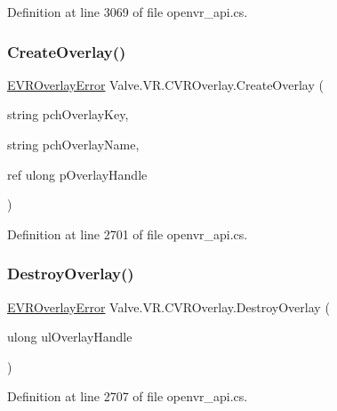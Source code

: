 Definition at line 3069 of file openvr\+\_\+api.\+cs.

\mbox{\label{class_valve_1_1_v_r_1_1_c_v_r_overlay_a4b1c60e2e0e778f30b2a39a987f96de5}} 
\subsubsection{\texorpdfstring{CreateOverlay()}{CreateOverlay()}}
{\footnotesize\ttfamily \mbox{\hyperlink{namespace_valve_1_1_v_r_aaee5c5144f42b7969d45b854f51b0c18}{E\+V\+R\+Overlay\+Error}} Valve.\+V\+R.\+C\+V\+R\+Overlay.\+Create\+Overlay (\begin{DoxyParamCaption}\item[{string}]{pch\+Overlay\+Key,  }\item[{string}]{pch\+Overlay\+Name,  }\item[{ref ulong}]{p\+Overlay\+Handle }\end{DoxyParamCaption})}



Definition at line 2701 of file openvr\+\_\+api.\+cs.

\mbox{\label{class_valve_1_1_v_r_1_1_c_v_r_overlay_a6bbcbda8364751a199a9219de2142f23}} 
\subsubsection{\texorpdfstring{DestroyOverlay()}{DestroyOverlay()}}
{\footnotesize\ttfamily \mbox{\hyperlink{namespace_valve_1_1_v_r_aaee5c5144f42b7969d45b854f51b0c18}{E\+V\+R\+Overlay\+Error}} Valve.\+V\+R.\+C\+V\+R\+Overlay.\+Destroy\+Overlay (\begin{DoxyParamCaption}\item[{ulong}]{ul\+Overlay\+Handle }\end{DoxyParamCaption})}



Definition at line 2707 of file openvr\+\_\+api.\+cs.

\mbox{\label{class_valve_1_1_v_r_1_1_c_v_r_overlay_ab5ba01ab05993d19f36d985909c71677}} 

